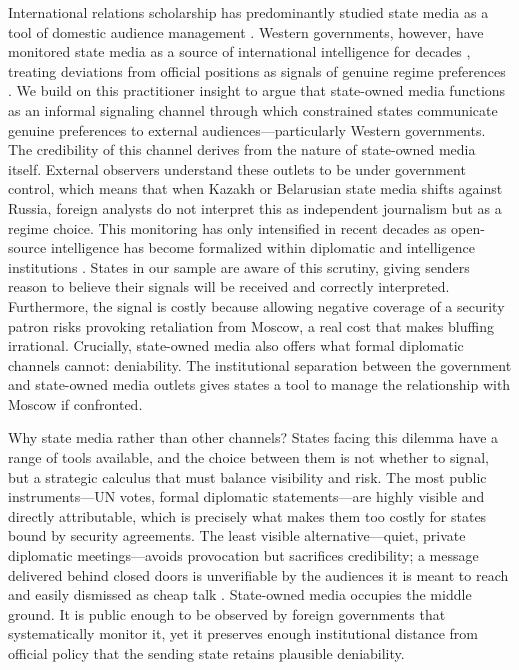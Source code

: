\documentclass[12pt]{article}
\begin{document}
International relations scholarship has predominantly studied state media as a tool of domestic audience management \citep{mccombs_agenda-setting_2002, guriev_spin_2022}. Western governments, however, have monitored state media as a source of international intelligence for decades \citep{favere_debating_2024, bbc_monitoring_written_2016}, treating deviations from official positions as signals of genuine regime preferences \citep{williams_defining_2018}. We build on this practitioner insight to argue that state-owned media functions as an informal signaling channel through which constrained states communicate genuine preferences to external audiences---particularly Western governments. The credibility of this channel derives from the nature of state-owned media itself. External observers understand these outlets to be under government control, which means that when Kazakh or Belarusian state media shifts against Russia, foreign analysts do not interpret this as independent journalism but as a regime choice. This monitoring has only intensified in recent decades as open-source intelligence has become formalized within diplomatic and intelligence institutions \citep{manor_digitalization_2019, usic_ic_2024}. States in our sample are aware of this scrutiny, giving senders reason to believe their signals will be received and correctly interpreted. Furthermore, the signal is costly because allowing negative coverage of a security patron risks provoking retaliation from Moscow, a real cost that makes bluffing irrational. Crucially, state-owned media also offers what formal diplomatic channels cannot: deniability. The institutional separation between the government and state-owned media outlets gives states a tool to manage the relationship with Moscow if confronted.
 
Why state media rather than other channels? States facing this dilemma have a range of tools available, and the choice between them is not whether to signal, but a strategic calculus that must balance visibility and risk. The most public instruments---UN votes, formal diplomatic statements---are highly visible and directly attributable, which is precisely what makes them too costly for states bound by security agreements. The least visible alternative---quiet, private diplomatic meetings---avoids provocation but sacrifices credibility; a message delivered behind closed doors is unverifiable by the audiences it is meant to reach and easily dismissed as cheap talk \citep{fearon_signaling_1997}. State-owned media occupies the middle ground. It is public enough to be observed by foreign governments that systematically monitor it, yet it preserves enough institutional distance from official policy that the sending state retains plausible deniability.
 
\end{document}

